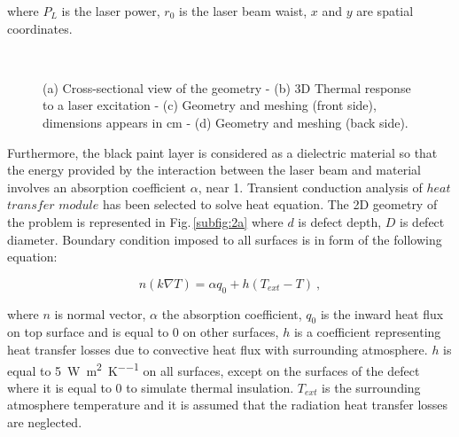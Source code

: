 \noindent where $P_L$ is the laser power, $r_0$ is the laser beam waist, $x$ and $y$ are spatial coordinates.

\begin{figure}
  \centering
  \hspace*{\fill}
	\hfill
	\hspace*{\fill} \\ \hspace*{\fill}
	\hfill
	\hspace*{\fill}
	\caption{(a) Cross-sectional view of the geometry - (b) 3D Thermal response to a laser 
	excitation - (c) Geometry and meshing (front side), dimensions appears in cm  - (d) 
	Geometry and meshing (back side).}
  \label{fig:2}
\end{figure}

Furthermore, the black paint layer is considered as a dielectric material so that the energy provided by the interaction between the laser beam and material involves an absorption coefficient $\alpha$, near 1.
Transient conduction analysis of $heat$ $transfer$ $module$ has been selected to solve heat equation. The 2D geometry of the problem is represented in Fig.\,\ref{subfig:2a} where $d$ is defect depth, $D$ is defect diameter. Boundary condition imposed to all surfaces is in form of the following equation:

\begin{equation}
  \label{eq:33}
  n(k \nabla T) = \alpha q_0 + h(T_{ext} - T) \ ,
\end{equation}

\noindent where $n$ is normal vector, $\alpha$ the absorption coefficient, $q_0$ is the inward heat flux on top surface and is equal to 0 on other surfaces, $h$ is a coefficient representing heat transfer losses due to convective heat flux with surrounding atmosphere. $h$ is equal to \SI{5}{\watt \per \square \metre \per \kelvin} on all surfaces, except on the surfaces of the defect where it is equal to 0 to simulate thermal insulation. $T_{ext}$ is the surrounding atmosphere temperature and it is assumed that the radiation heat transfer losses are neglected. 

